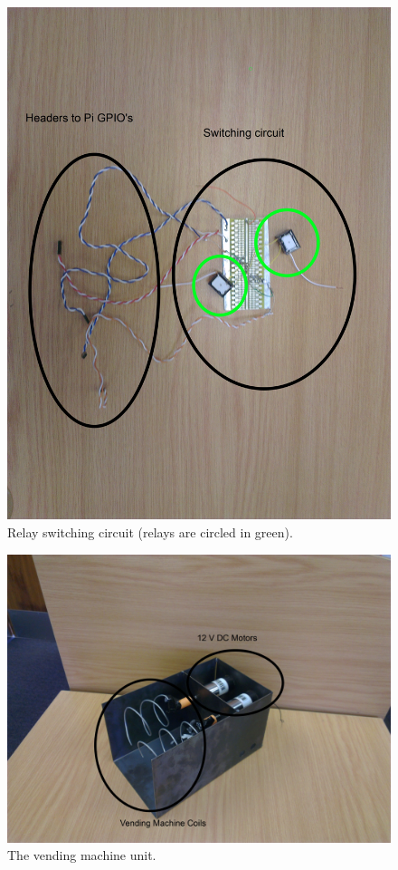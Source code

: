\begin{figure}
 \centering 
 \includegraphics[clip=true, trim = 0 200 0 400,
 scale=0.15]{switch_pic}
 \caption[Relay switching circuit.]{Relay switching circuit (relays are
 circled in green).}
 \label{fig:switch}
\end{figure}

\begin{figure}
 \centering 
 \includegraphics[clip=true, trim = 550 0 400 300,
 scale=0.18]{vm}
 \caption{The vending machine unit.}
 \label{fig:vm}
\end{figure}